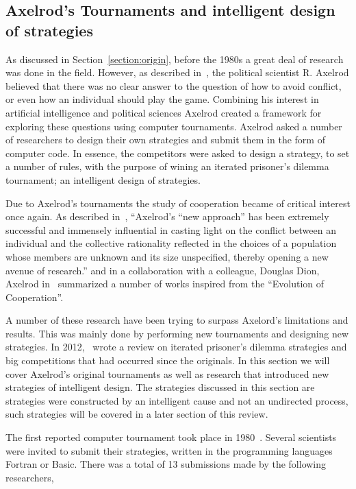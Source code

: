 \documentclass{article}
\theoremstyle{definition}
\begin{document}
\subsection{Axelrod's Tournaments and intelligent design of strategies}\label{subsection:intelligent_design}

As discussed in Section~\ref{section:origin}, before the 1980s a great deal of
research was done in the field. However, as described in~\cite{Axelrod2012}, the
political scientist R. Axelrod believed that there was no clear answer to the question
of how to avoid conflict, or even how an individual should play the game. Combining
his interest in artificial intelligence and political sciences Axelrod created a
framework for exploring these questions using computer tournaments.
Axelrod asked a number of researchers to design their own strategies and submit them
in the form of computer code. In essence, the competitors were asked to design a
strategy, to set a number of rules, with the purpose of wining an iterated prisoner's
dilemma tournament; an intelligent design of strategies.

Due to Axelrod's tournaments the study of cooperation became of critical interest
once again. As described in~\cite{Rapoport2015}, ``Axelrod's “new approach” has been extremely
successful and immensely influential in casting light on the conflict between an
individual and the collective rationality reflected in the choices of a population
whose members are unknown and its size unspecified, thereby opening a new avenue
of research.'' and in a collaboration with a colleague, Douglas Dion,
Axelrod in~\cite{Axelrod1988} summarized a number of works inspired from the
``Evolution of Cooperation''.

A number of these research have been trying to surpass Axelord's limitations
and results. This was mainly done by performing new tournaments and designing
new strategies. In 2012,~\cite{Jurisic2012} wrote a review on iterated prisoner's
dilemma strategies and big competitions that had occurred since the originals.
In this section we will cover Axelrod's original tournaments as well as 
research that introduced new strategies of intelligent design. The strategies discussed in
this section are strategies were constructed by an intelligent cause and not an
undirected process, such strategies will be covered in a later section of this review.

The first reported computer tournament took place in 1980~\cite{Axelrod1980a}.
Several scientists were invited to submit their strategies, written in the
programming languages Fortran or Basic. There was a total of 13 submissions
made by the following researchers,
\end{document}
